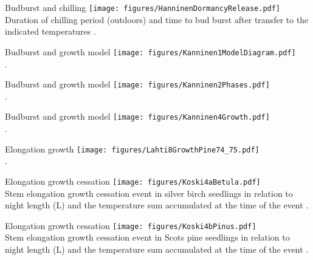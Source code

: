 \documentclass[10pt]{beamer}
\begin{document}
\begin{frame}{Budburst and chilling}
    \centering
    \texttt{[image: figures/HanninenDormancyRelease.pdf]}\\
    {\small Duration of chilling period (outdoors) and time to bud burst after transfer
    to the indicated temperatures \autocite[from][]{Hanninen1990}.}
\end{frame}

\begin{frame}{Budburst and growth model}
    \centering
    \texttt{[image: figures/Kanninen1ModelDiagram.pdf]}\\
    {\small \autocite[from][]{KanninenEtAl1982}.}
\end{frame}

\begin{frame}{Budburst and growth model}
    \centering
    \texttt{[image: figures/Kanninen2Phases.pdf]}\\
    {\small \autocite[from][]{KanninenEtAl1982}.}
\end{frame}

\begin{frame}{Budburst and growth model}
    \centering
    \texttt{[image: figures/Kanninen4Growth.pdf]}\\
    {\small \autocite[from][]{KanninenEtAl1982}.}
\end{frame}

\begin{frame}{Elongation growth}
    \centering
    \texttt{[image: figures/Lahti8GrowthPine74\_75.pdf]}\\
    {\small \autocite[from Kanninen 1990 in][]{LahSmo1990}.}
\end{frame}

\begin{frame}{Elongation growth cessation}
    \centering
    \texttt{[image: figures/Koski4aBetula.pdf]}\\
    {\small Stem elongation growth cessation event in silver birch
    seedlings in relation to night length (L) and the temperature
    sum accumulated at the time of the event \autocite[from][]{Koski1985}.}
\end{frame}

\begin{frame}{Elongation growth cessation}
    \centering
    \texttt{[image: figures/Koski4bPinus.pdf]}\\
    {\small Stem elongation growth cessation event in Scots pine
    seedlings in relation to night length (L) and the temperature
    sum accumulated at the time of the event \autocite[from][]{Koski1985}.}
\end{frame}
\end{document}
